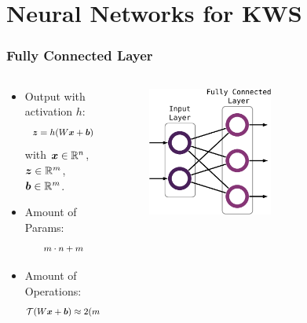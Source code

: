 
\section{Neural Networks for KWS}

\begin{frame}
  \frametitle{Fully Connected Layer}
  \begin{columns}
    \begin{column}{0.45\textwidth}
      \begin{itemize}
        \item Output with activation $h$:
        \begin{equation*}
          \footnotesize
          \begin{aligned}
            \bm{z} = h(W \bm{x} + \bm{b})
          \end{aligned}
        \end{equation*}
        {\scriptsize with $\bm{x} \in \mathbb{R}^n$, $\bm{z} \in \mathbb{R}^m$, $\bm{b} \in \mathbb{R}^m$.}
        \vspace{0.2cm}
        \item Amount of Params:
        \begin{equation*}
          \footnotesize
          \begin{aligned}
            m \cdot n + m
          \end{aligned}
        \end{equation*}
        \item Amount of Operations:
        \begin{equation*}
          \footnotesize
          \begin{aligned}
            \mathcal{T}(W \bm{x} + \bm{b}) \approx 2 (m \cdot n) + m
          \end{aligned}
        \end{equation*}     
      \end{itemize}
    \end{column}
    \begin{column}{0.55\textwidth}
      \vspace{0.75cm}
      \centering
      \begin{figure} \includegraphics[width=0.55\textwidth]{../4_nn/figs/nn_theory_fc.pdf} \end{figure}
      \vfill
    \end{column}
  \end{columns}
\end{frame}

